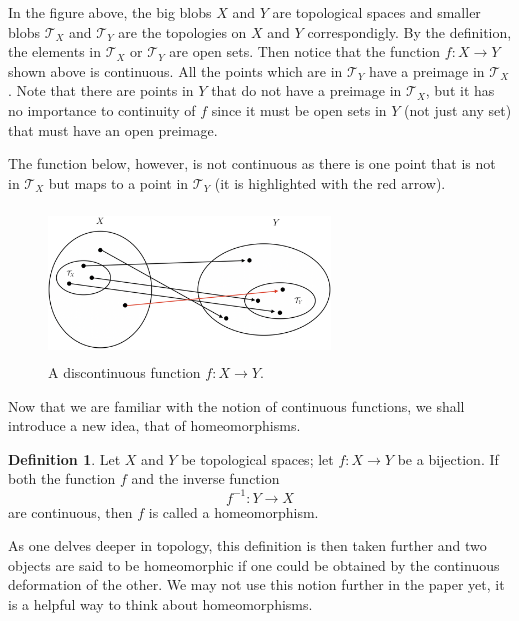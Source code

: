 \documentclass{article}
\newcommand{\topology}{\mathcal{T}}              %
\theoremstyle{definition}
\newtheorem*{definition}{Definition}
\begin{document}
In the figure above, the big blobs $X$ and $Y$ are topological spaces and smaller blobs $\topology_X$
and $\topology_Y$ are the topologies on $X$ and $Y$ correspondigly. By the definition, the elements in $\topology_X$
or $\topology_Y$ are open sets. Then notice that the function $f : X \to Y$ shown above is continuous. All the points
which are in $\topology_Y$ have a preimage in $\topology_X$. Note that there are points in $Y$ that do not have a preimage
in $\topology_X$, but it has no importance to continuity of $f$ since it must be open sets in $Y$ (not just any set) that must
have an open preimage.

\bigskip

The function below, however, is not continuous as there is one point that is not in $\topology_X$
but maps to a point in $\topology_Y$ (it is highlighted with the red arrow).

\begin{figure}[H]
    \centering
    \includegraphics[width=7.5cm, height=4cm]{discontinuous-function}
    \caption*{A discontinuous function $f : X \to Y$.}
\end{figure}

\bigskip

Now that we are familiar with the notion of continuous functions, we shall introduce a new idea, that of homeomorphisms.

\begin{definition}
\cite{7} Let $X$ and $Y$ be topological spaces; let $f : X \to Y$ be a bijection. If both the function $f$
and the inverse function
$$f^{-1} : Y \to X$$
are continuous, then $f$ is called a homeomorphism.
\end{definition}

As one delves deeper in topology, this definition is then taken further and two objects are said to be homeomorphic if
one could be obtained by the continuous deformation of the other. We may not use this notion further in the paper yet,
it is a helpful way to think about homeomorphisms.

\end{document}
